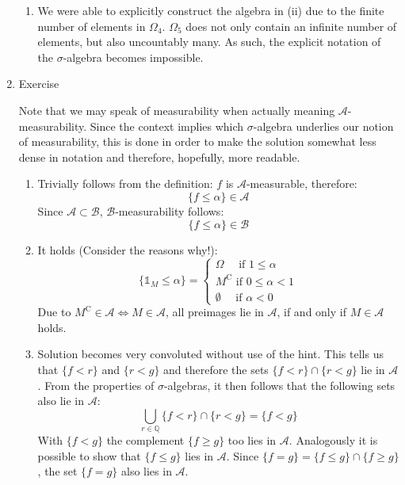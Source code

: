 \documentclass[12pt,a4paper]{article}
\begin{document}
\begin{enumerate}
\begin{enumerate}[label=(\roman*)]
\item We were able to explicitly construct the algebra in (ii) due to the finite number of elements in $\Omega_4$. $\Omega_5$ does not only contain an infinite number of elements, but also uncountably many. As such, the explicit notation of the $\sigma$-algebra becomes impossible.

\end{enumerate}


\item Exercise

Note that we may speak of measurability when actually meaning $\mathscr{A}$-measurability. Since the context implies which $\sigma$-algebra underlies our notion of measurability, this is done in order to make the solution somewhat less dense in notation and therefore, hopefully, more readable.

\begin{enumerate}[label=(\roman*)]

\item Trivially follows from the definition: $f$ is $\mathscr{A}$-measurable, therefore: \[
\{f \leq \alpha\} \in \mathscr{A}
\] 
Since $\mathscr{A} \subset \mathscr{B}$,  $\mathscr{B}$-measurability follows: \[
\{f \leq \alpha\} \in \mathscr{B}
\]

\item It holds (Consider the reasons why!): \[
\{\mathds{1}_M \leq \alpha\}=\begin{cases} \Omega\quad \text{   if } 1\leq \alpha\\
M^{\mathrm{C}} \text{ if } 0 \leq \alpha < 1\\
\emptyset \quad\text{ if } \alpha < 0 \end{cases}
\]
Due to $M^{\mathrm{C}} \in \mathscr{A} \iff M \in \mathscr{A}$, all preimages lie in $\mathscr{A}$, if and only if $M \in \mathscr{A}$ holds.

\item  Solution becomes very convoluted without use of the hint. This tells us that $\{ f < r\}$ and $\{ r < g\}$ and therefore the sets $\{ f < r\} \cap \{ r < g\}$ lie in $\mathscr{A}$. From the properties of $\sigma$-algebras, it then follows that the following sets also lie in $\mathscr{A}$: \[
\bigcup\limits_{r \in \mathbb{Q}} \{ f < r\} \cap \{ r < g\} = \{ f < g\}
\]
With $\{ f < g\}$ the complement $\{ f \geq g\}$ too lies in $\mathscr{A}$. Analogously it is possible to show that $\{ f \leq g\}$ lies in $\mathscr{A}$. Since $\{ f = g\} = \{f \leq g\} \cap \{ f \geq g\}$, the set $\{ f = g\}$ also lies in $\mathscr{A}$.


\end{enumerate}
\end{enumerate}
\end{document}
